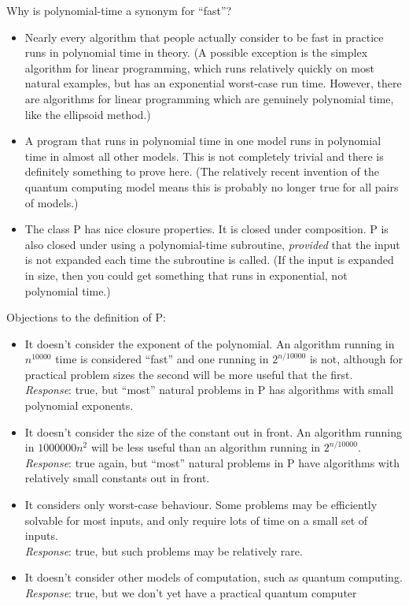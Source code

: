 \documentclass[12pt]{article}
\theoremstyle{plain}
\theoremstyle{definition}
\begin{document}
Why is polynomial-time a synonym for ``fast''?
\begin{itemize}
  \item Nearly every algorithm that people actually consider to be fast in practice runs in polynomial time in theory.
  (A possible exception is the simplex algorithm for linear programming, which runs relatively quickly on most natural examples, but has an exponential worst-case run time.
  However, there are algorithms for linear programming which are genuinely polynomial time, like the ellipsoid method.)

  \item A program that runs in polynomial time in one model runs in polynomial time in almost all other models.
  This is not completely trivial and there is definitely something to prove here.
  (The relatively recent invention of the quantum computing model means this is probably no longer true for all pairs of models.)

  \item The class P has nice closure properties.
  It is closed under composition.
  P is also closed under using a polynomial-time subroutine, \emph{provided} that the input is not expanded each time the subroutine is called. (If the input is expanded in size, then you could get something that runs in exponential, not polynomial time.)
\end{itemize}

Objections to the definition of P:
\begin{itemize}
  \item It doesn't consider the exponent of the polynomial.
  An algorithm running in $n^{10000}$ time is considered ``fast'' and one running in $2^{n/10000}$ is not, although for practical problem sizes the second will be more useful that the first. \\
  \emph{Response}: true, but ``most'' natural problems in P has algorithms with small polynomial exponents.

  \item It doesn't consider the size of the constant out in front.
  An algorithm running in $1000000n^{2}$ will be less useful than an algorithm running in $2^{n/10000}$. \\
  \emph{Response}: true again, but ``most'' natural problems in P have algorithms with relatively small constants out in front.

  \item It considers only worst-case behaviour.
  Some problems may be efficiently solvable for most inputs, and only require lots of time on a small set of inputs. \\
  \emph{Response}: true, but such problems may be relatively rare.

  \item It doesn't consider other models of computation, such as quantum computing. \\
  \emph{Response}: true, but we don't yet have a practical quantum computer
\end{itemize}
\end{document}
